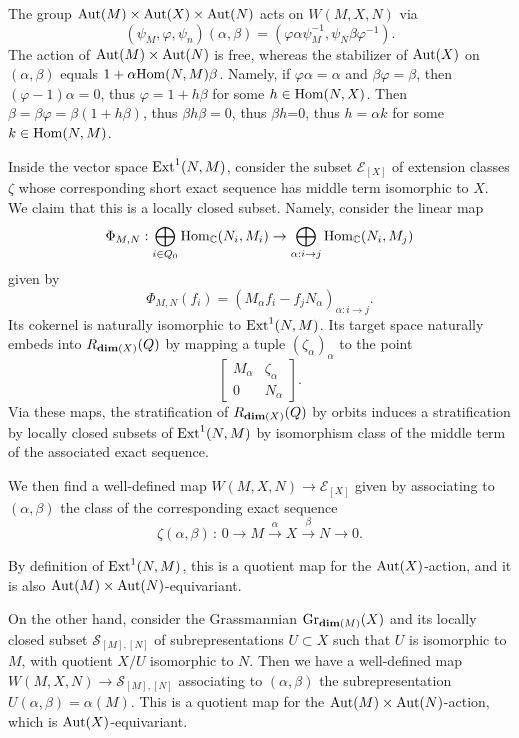 \documentclass{amsart}
\numberwithin{equation}{section}
\theoremstyle{remark}
\begin{document}
The group ${\rm Aut}(M)\times{\rm Aut}(X)\times{\rm Aut}(N)$ acts on $W(M,X,N)$ via
$$(\psi_M,\varphi,\psi_n)(\alpha,\beta)=(\varphi\alpha\psi_M^{-1},\psi_N\beta\varphi^{-1}).$$
The action of ${\rm Aut}(M)\times{\rm Aut}(N)$ is free, whereas the stabilizer of ${\rm Aut}(X)$ on $(\alpha,\beta)$ equals $1+\alpha{\rm Hom}(N,M)\beta$. Namely, if $\varphi\alpha=\alpha$ and $\beta\varphi=\beta$, then $(\varphi-1)\alpha=0$, thus $\varphi=1+h\beta$ for some $h\in{\rm Hom}(N,X)$. Then $\beta=\beta\varphi=\beta(1+h\beta)$, thus $\beta h\beta=0$, thus $\beta h$=0, thus $h=\alpha k$ for some $k\in{\rm Hom}(N,M)$.

Inside the vector space ${\rm Ext}^1(N,M)$, consider the subset $\mathcal{E}_{[X]}$ of extension classes $\zeta$ whose corresponding short exact sequence has middle term isomorphic to $X$. We claim that this is a locally closed subset. Namely, consider the linear map
$$\Phi_{M,N}:\bigoplus_{i\in Q_0}{\rm Hom}_\mathbb{C}(N_i,M_i)\rightarrow\bigoplus_{\alpha:i\rightarrow j}{\rm Hom}_\mathbb{C}(N_i,M_j)$$
given by
$$\Phi_{M,N}(f_i)=(M_\alpha f_i-f_jN_\alpha)_{\alpha:i\rightarrow j}.$$
Its cokernel is naturally isomorphic to ${\rm Ext}^1(N,M)$. Its target space %
naturally embeds into $R_{{\rm\bf dim}(X)}(Q)$ by mapping a tuple $(\zeta_\alpha)_\alpha$ to the point
$$\left[\begin{array}{cc}M_\alpha&\zeta_\alpha\\ 0&N_\alpha\end{array}\right].$$
Via these maps, the stratification of $R_{{\rm\bf dim}(X)}(Q)$ by orbits induces a stratification by locally closed subsets of ${\rm Ext}^1(N,M)$ by isomorphism class of the middle term of the associated exact sequence.

 We then find a well-defined map $W(M,X,N)\rightarrow\mathcal{E}_{[X]}$ given by associating to $(\alpha,\beta)$ the class of the corresponding exact sequence $$\zeta(\alpha,\beta)\, :\, 0\rightarrow M\stackrel{\alpha}{\rightarrow}X\stackrel{\beta}{\rightarrow}N\rightarrow 0.$$

By definition of ${\rm Ext}^1(N,M)$, this is a quotient map for the ${\rm Aut}(X)$-action, and it is also ${\rm Aut}(M)\times{\rm Aut}(N)$-equivariant.

On the other hand, consider the Grassmannian ${\rm Gr}_{{\rm\bf dim}(M)}(X)$ and its locally  closed subset $\mathcal{S}_{[M],[N]}$ of subrepresentations $U\subset X$ such that $U$ is isomorphic to $M$, with quotient $X/U$ isomorphic to $N$. Then we have a well-defined map $W(M,X,N)\rightarrow\mathcal{S}_{[M],[N]}$ associating to $(\alpha,\beta)$ the subrepresentation $U(\alpha,\beta)=\alpha(M)$. This is a quotient map for the ${\rm Aut}(M)\times{\rm Aut}(N)$-action, which is ${\rm Aut}(X)$-equivariant.
\end{document}
